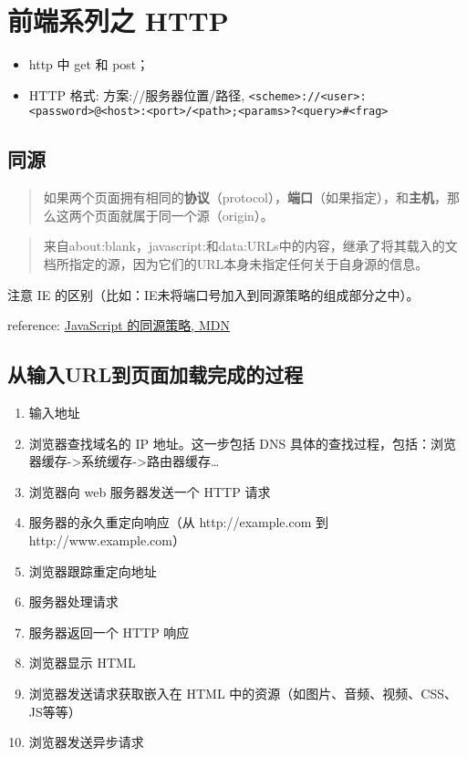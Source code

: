 \section{前端系列之 HTTP}\hypertarget{http}{}\label{http}

\begin{itemize}
\item http 中 get 和 post；
\item HTTP 格式: 方案://服务器位置/路径, \texttt{\textless{}scheme\textgreater{}://\textless{}user\textgreater{}:\textless{}password\textgreater{}@\textless{}host\textgreater{}:\textless{}port\textgreater{}/\textless{}path\textgreater{};\textless{}params\textgreater{}?\textless{}query\textgreater{}\#\textless{}frag\textgreater{}}
\end{itemize}

\subsection{同源}\hypertarget{section}{}\label{section}

\begin{quote}
如果两个页面拥有相同的\textbf{协议}（protocol），\textbf{端口}（如果指定），和\textbf{主机}，那么这两个页面就属于同一个源（origin）。
\end{quote}

\begin{quote}
来自about:blank，javascript:和data:URLs中的内容，继承了将其载入的文档所指定的源，因为它们的URL本身未指定任何关于自身源的信息。
\end{quote}

注意 IE 的区别（比如：IE未将端口号加入到同源策略的组成部分之中）。

reference: \href{https://developer.mozilla.org/zh-CN/docs/Web/Security/Same-origin\_policy}{JavaScript 的同源策略, MDN}

\subsection{从输入URL到页面加载完成的过程}\hypertarget{url}{}\label{url}

\begin{enumerate}
\item 输入地址
\item 浏览器查找域名的 IP 地址。这一步包括 DNS 具体的查找过程，包括：浏览器缓存-\textgreater{}系统缓存-\textgreater{}路由器缓存\ldots{}
\item 浏览器向 web 服务器发送一个 HTTP 请求
\item 服务器的永久重定向响应（从 http://example.com 到 http://www.example.com）
\item 浏览器跟踪重定向地址
\item 服务器处理请求
\item 服务器返回一个 HTTP 响应
\item 浏览器显示 HTML
\item 浏览器发送请求获取嵌入在 HTML 中的资源（如图片、音频、视频、CSS、JS等等）
\item 浏览器发送异步请求
\end{enumerate}

